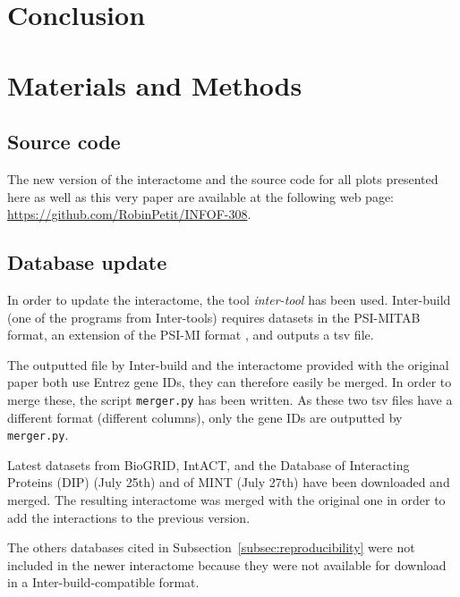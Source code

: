 \documentclass[letterpaper]{article}
\begin{document}
\section{Conclusion}

\section{Materials and Methods}
	\subsection{Source code}
	The new version of the interactome and the source code for all plots presented here as well as this
	very paper are available at the following web page: \url{https://github.com/RobinPetit/INFOF-308}.

	\subsection{Database update}
	In order to update the interactome, the tool \textit{inter-tool} \citep{inter-tools} has been used.
	Inter-build (one of the programs from Inter-tools) requires datasets in the PSI-MITAB format, an extension of the
	PSI-MI format \citep{MITABFormat}, and outputs a tsv file.

	The outputted file by Inter-build and the interactome provided with the original paper both use Entrez
	gene IDs, they can therefore easily be merged. In order to merge these, the script \texttt{merger.py}
	has been written. As these two tsv files have a different format (different columns), only the gene IDs
	are outputted by \texttt{merger.py}.

	Latest datasets from BioGRID, IntACT, and the Database of Interacting Proteins (DIP) \citep{salwinski2004DIP}
	(July 25th) and of MINT (July 27th) have been downloaded and merged. The resulting interactome was merged with
	the original one in order to add the interactions to the previous version.

	The others databases cited in Subsection~\ref{subsec:reproducibility} were not included in the newer
	interactome because they were not available for download in a Inter-build-compatible format.

\footnotesize

{}
\end{document}
